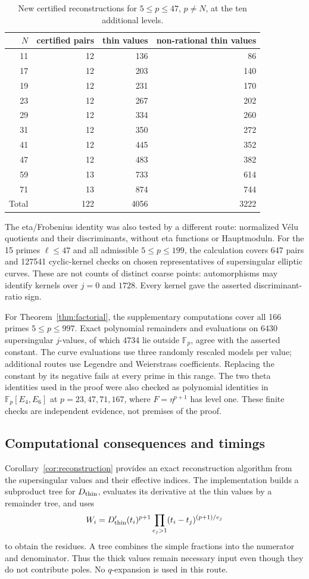 \documentclass[11pt,a4paper]{article}
\numberwithin{equation}{section}
\theoremstyle{definition}
\theoremstyle{remark}
\newcommand{\Fp}{\mathbb F_p}
\begin{document}
\begin{table}[htbp]\centering
\begin{tabular}{rrrr}\toprule
$N$ & certified pairs & thin values & non-rational thin values\\\midrule
11&12&136&86\\
17&12&203&140\\
19&12&231&170\\
23&12&267&202\\
29&12&334&260\\
31&12&350&272\\
41&12&445&352\\
47&12&483&382\\
59&13&733&614\\
71&13&874&744\\\midrule
Total&122&4056&3222\\\bottomrule
\end{tabular}
\caption{New certified reconstructions for $5\le p\le47$, $p\ne N$,
at the ten additional levels.}\label{tab:new-levels}
\end{table}

The eta/Frobenius identity was also tested by a different route: normalized
V\'elu quotients and their discriminants, without eta functions or Hauptmoduln.
For the 15 primes $\ell\le47$ and all admissible $5\le p\le199$, the calculation
covers 647 pairs and 127541 cyclic-kernel checks on chosen representatives of
supersingular elliptic curves. These are not counts of distinct coarse points:
automorphisms may identify kernels over $j=0$ and $1728$.
Every kernel gave the asserted discriminant-ratio sign.

For Theorem~\ref{thm:factorial}, the supplementary computations cover all
166 primes $5\le p\le997$. Exact polynomial remainders and evaluations
on 6430 supersingular $j$-values, of which 4734 lie outside $\Fp$, agree
with the asserted constant. The curve evaluations use three randomly
rescaled models per value; additional routes use Legendre and Weierstrass
coefficients. Replacing the constant by its negative fails at every prime
in this range. The two theta identities used in the proof were also
checked as polynomial identities in $\Fp[E_4,E_6]$ at
$p=23,47,71,167$, where $F=\eta^{p+1}$ has level one.
These finite checks are independent evidence, not premises of the proof.


\subsection{Computational consequences and timings}\label{subsec:benchmarks}
Corollary~\ref{cor:reconstruction} provides an exact reconstruction algorithm
from the supersingular values and their effective indices. The implementation
builds a subproduct tree for $D_{\rm thin}$, evaluates its derivative at the
thin values by a remainder tree, and uses
\[
W_i=D_{\rm thin}'(t_i)^{p+1}
\prod_{e_j>1}(t_i-t_j)^{(p+1)/e_j}
\]
to obtain the residues. A tree combines the simple fractions into the numerator
and denominator. Thus the thick values remain necessary input even though
they do not contribute poles. No $q$-expansion is used in this route.
\end{document}
